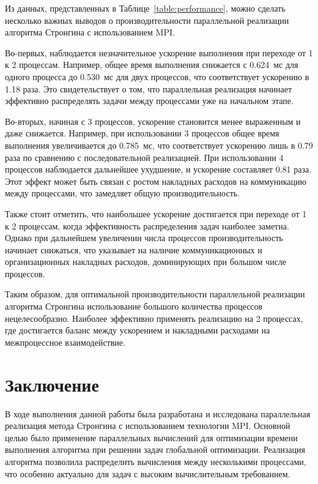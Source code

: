 \documentclass[a4paper,12pt]{article}
\begin{document}
Из данных, представленных в Таблице~\ref{table:performance}, можно сделать несколько важных выводов о производительности параллельной реализации алгоритма Стронгина с использованием MPI.

Во-первых, наблюдается незначительное ускорение выполнения при переходе от 1 к 2 процессам. Например, общее время выполнения снижается с 0.624~мс для одного процесса до 0.530~мс для двух процессов, что соответствует ускорению в 1.18 раза. Это свидетельствует о том, что параллельная реализация начинает эффективно распределять задачи между процессами уже на начальном этапе.

Во-вторых, начиная с 3 процессов, ускорение становится менее выраженным и даже снижается. Например, при использовании 3 процессов общее время выполнения увеличивается до 0.785~мс, что соответствует ускорению лишь в 0.79 раза по сравнению с последовательной реализацией. При использовании 4 процессов наблюдается дальнейшее ухудшение, и ускорение составляет 0.81 раза. Этот эффект может быть связан с ростом накладных расходов на коммуникацию между процессами, что замедляет общую производительность.

Также стоит отметить, что наибольшее ускорение достигается при переходе от 1 к 2 процессам, когда эффективность распределения задач наиболее заметна. Однако при дальнейшем увеличении числа процессов производительность начинает снижаться, что указывает на наличие коммуникационных и организационных накладных расходов, доминирующих при большом числе процессов.

Таким образом, для оптимальной производительности параллельной реализации алгоритма Стронгина использование большого количества процессов нецелесообразно. Наиболее эффективно применять реализацию на 2 процессах, где достигается баланс между ускорением и накладными расходами на межпроцессное взаимодействие.

\section{Заключение}

В ходе выполнения данной работы была разработана и исследована параллельная реализация метода Стронгина с использованием технологии MPI. Основной целью было применение параллельных вычислений для оптимизации времени выполнения алгоритма при решении задач глобальной оптимизации. Реализация алгоритма позволила распределить вычисления между несколькими процессами, что особенно актуально для задач с высоким вычислительным требованием.
\end{document}
